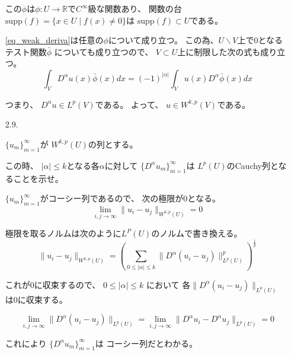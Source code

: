 \documentclass[12pt,b5paper]{ltjsarticle}
\begin{document}
\begin{enumerate}
       この$\phi$は$\phi:U\to\mathbb{R}$で$C^{\infty}$級な関数あり、
       関数の台$\mathrm{supp}(f)=\{x\in U \mid f(x)\ne 0\}$は
       $\mathrm{supp}(f) \subset U$である。

       \eqref{eq_weak_deriva}は任意の$\phi$について成り立つ。
       この為、$U\backslash V$上で$0$となるテスト関数$\bar{\phi}$
       についても成り立つので、
       $V\subset U$上に制限した次の式も成り立つ。
       \begin{equation}
        \int_{V} D^{\alpha}u(x) \bar{\phi}(x) dx
         = (-1)^{\lvert \alpha \rvert}\int_{V} u(x) D^{\alpha}\bar{\phi}(x) dx
       \end{equation}

       つまり、
       $D^{\alpha}u \in L^{p}(V)$である。
       よって、
       $u\in W^{k,p}(V)$である。





       \hrulefill

 \item [2.9.]

%


       $\{u_{m}\}_{m=1}^{\infty}$が
       $W^{k,p}(U)$の列とする。

       この時、
       $\lvert \alpha \rvert \leq k$となる各$\alpha$に対して
       $\{D^{\alpha}u_{m}\}_{m=1}^{\infty}$は
       $L^{p}(U)$のCauchy列となることを示せ。

       \dotfill

       $\{u_{m}\}_{m=1}^{\infty}$がコーシー列であるので、
       次の極限が$0$となる。
       \begin{equation}
        \lim_{i,j\to\infty}\| u_{i} - u_{j} \|_{W^{k,p}(U)}=0
       \end{equation}

       極限を取るノルムは次のように$L^{P}(U)$のノルムで書き換える。
       \begin{equation}
        \| u_{i} - u_{j} \|_{W^{k,p}(U)}
         =
         \left(
          \sum_{0\leq \lvert \alpha \rvert \leq k}
          \| D^{\alpha}(u_{i}-u_{j}) \|_{L^{p}(U)}^{p}
         \right)^{\frac{1}{p}}
       \end{equation}

       これが$0$に収束するので、
       $0\leq \lvert \alpha \rvert \leq k$
       において
       各$\| D^{\alpha}(u_{i}-u_{j}) \|_{L^{p}(U)}$
       は$0$に収束する。

       \begin{equation}
        \lim_{i,j\to\infty} \| D^{\alpha}(u_{i}-u_{j}) \|_{L^{p}(U)}
         =
         \lim_{i,j\to\infty} \| D^{\alpha}u_{i} - D^{\alpha}u_{j} \|_{L^{p}(U)}
         =0
       \end{equation}

       これにより
       $\{D^{\alpha}u_{m}\}_{m=1}^{\infty}$は
       コーシー列だとわかる。
       
       \hrulefill

\end{enumerate}
\end{document}
